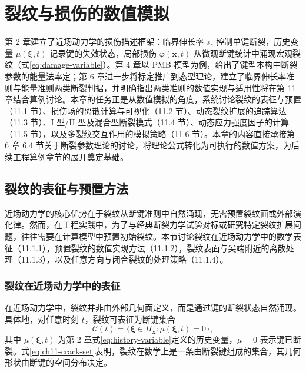\chapter{裂纹与损伤的数值模拟}

\leavevmode\usetikzlibrary{arrows.meta}

第 2 章建立了近场动力学的损伤描述框架：临界伸长率 $s_c$ 控制单键断裂，历史变量 $\mu(\boldsymbol{\xi},t)$ 记录键的失效状态，局部损伤 $\varphi(\mathbf{x},t)$ 从微观断键统计中涌现宏观裂纹（式\eqref{eq:damage-variable}）。第 4 章以 PMB 模型为例，给出了键型本构中断裂参数的能量法率定；第 6 章进一步将标定推广到态型理论，建立了临界伸长率准则与能量准则两类断裂判据，并明确指出两类准则的数值实现与适用性将在第 11 章结合算例讨论。本章的任务正是从数值模拟的角度，系统讨论裂纹的表征与预置（11.1 节）、损伤场的离散计算与可视化（11.2 节）、动态裂纹扩展的追踪算法（11.3 节）、I 型/II 型及混合型断裂模式（11.4 节）、动态应力强度因子的计算（11.5 节），以及多裂纹交互作用的模拟策略（11.6 节）。本章的内容直接承接第 6 章 6.4 节关于断裂参数理论的讨论，将理论公式转化为可执行的数值方案，为后续工程算例章节的展开奠定基础。

\section{裂纹的表征与预置方法}\label{sec:ch11-crack-repr}

近场动力学的核心优势在于裂纹从断键准则中自然涌现，无需预置裂纹面或外部演化律。然而，在工程实践中，为了与经典断裂力学试验对标或研究特定裂纹扩展问题，往往需要在计算模型中预置初始裂纹。本节讨论裂纹在近场动力学中的数学表征（11.1.1），预置裂纹的数值实现方法（11.1.2），裂纹表面与尖端附近的离散处理（11.1.3），以及任意方向与闭合裂纹的处理策略（11.1.4）。

\subsection{裂纹在近场动力学中的表征}\label{sec:ch11-crack-in-pd}

在近场动力学中，裂纹并非由外部几何面定义，而是通过键的断裂状态自然涌现。具体地，对任意时刻 $t$，裂纹可表征为断键集合
\begin{equation}
\mathcal{C}(t)=\bigl\{\boldsymbol{\xi}\in H_{\mathbf{x}}:\mu(\boldsymbol{\xi},t)=0\bigr\},
\label{eq:ch11-crack-set}
\end{equation}
其中 $\mu(\boldsymbol{\xi},t)$ 为第 2 章式\eqref{eq:history-variable}定义的历史变量，$\mu=0$ 表示键已断裂。式\eqref{eq:ch11-crack-set}表明，裂纹在数学上是一条由断裂键组成的集合，其几何形状由断键的空间分布决定。


